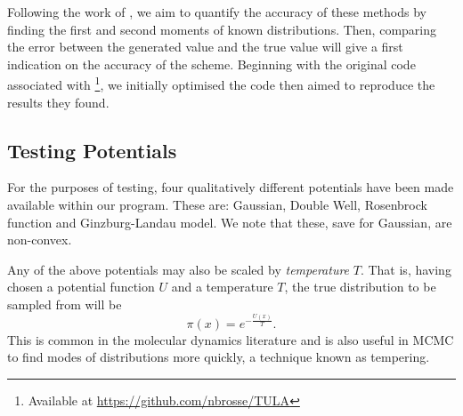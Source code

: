 Following the work of \cite{Brosse18tULA}, we aim to quantify the accuracy of these methods by finding the first and second moments of known distributions. Then, comparing the error between the generated value and the true value will give a first indication on the accuracy of the scheme. Beginning with the original code associated with \cite{Brosse18tULA}\footnote{Available at \url{https://github.com/nbrosse/TULA}}, we initially optimised the code then aimed to reproduce the results they found. 

\subsection{Testing Potentials}
For the purposes of testing, four qualitatively different potentials have been made available within our program. These are: Gaussian, Double Well, Rosenbrock function and Ginzburg-Landau model. We note that these, save for Gaussian, are non-convex.

Any of the above potentials may also be scaled by \textit{temperature} $T$. That is, having chosen a potential function $U$ and a temperature $T$, the true distribution to be sampled from will be
\[\pi(x) = e^{-\frac{U(x)}{T}}.\]
This is common in the molecular dynamics literature and is also useful in MCMC to find modes of distributions more quickly, a technique known as tempering.
